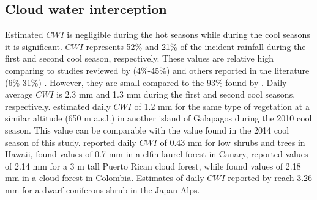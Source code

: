 \documentclass[a4paper,12pt]{article}
\begin{document}
\subsection{Cloud water interception}
Estimated $CWI$ is negligible during the hot seasons while during the cool seasons it is significant. $CWI$ represents 52\% and 21\% of the incident rainfall during the first and second cool season, respectively. These values are relative high comparing to studies reviewed by \cite{Bruijnzeeletal2011} (4\%-45\%) and others reported in the literature (6\%-31\%) \citep{Hutleyetal1997, Holwerdaetal2006, McJannetetal2007a, Holwerdaetal2010, Ueharaetal2012}. However, they are small compared to the 93\% found by \cite{CavalierandGoldstein1989}. Daily average $CWI$ is 2.3 mm and 1.3 mm during the first and second cool seasons, respectively. \cite{Pryetetal2012a} estimated daily $CWI$ of 1.2 mm for the same type of vegetation at a similar altitude (650 m a.s.l.) in another island of Galapagos during the 2010 cool season. This value can be comparable with the value found in the 2014 cool season of this study. \cite{Giambellucaetal2011} reported daily $CWI$ of 0.43 mm for low shrubs and trees in Hawaii, \cite{Ritteretal2008} found values of 0.7 mm in a elfin laurel forest in Canary, \cite{Holwerdaetal2006} reported values of 2.14 mm for a 3 m tall Puerto Rican cloud forest, while \cite{CavalierandGoldstein1989} found values of 2.18 mm in a cloud forest in Colombia. Estimates of daily $CWI$ reported by \cite{Ueharaetal2012} reach 3.26 mm for a dwarf coniferous shrub in the Japan Alps.
\end{document}
